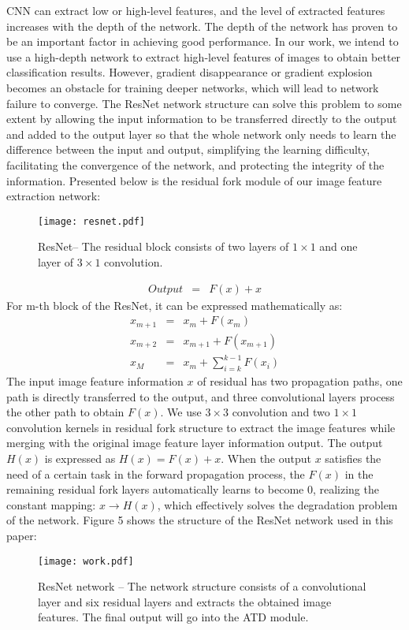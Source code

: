 \documentclass{ecai}
\begin{document}
CNN can extract low or high-level features, and the level of extracted features increases with the depth of the network. The depth of the network has proven to be an important factor in achieving good performance. In our work, we intend to use a high-depth network to extract high-level features of images to obtain better classification results. However, gradient disappearance or gradient explosion becomes an obstacle for training deeper networks, which will lead to network failure to converge. The ResNet network structure can solve this problem to some extent by allowing the input information to be transferred directly to the output and added to the output layer so that the whole network only needs to learn the difference between the input and output, simplifying the learning difficulty, facilitating the convergence of the network, and protecting the integrity of the information. Presented below is the residual fork module of our image feature extraction network:

\begin{figure}
\centerline{\texttt{[image: resnet.pdf]}}
\caption{ResNet-- The residual block consists of two layers of $1\times 1$  and one layer of $3\times 1$ convolution. }
\end{figure}

\begin{eqnarray}
Output  & = & F(x)+x
\end{eqnarray}
For m-th block of the ResNet, it can be expressed mathematically as:
\begin{eqnarray}
x_{m+1} & = & x_m+F(x_m)\\
x_{m+2} & = & x_{m+1}+F(x_{m+1})\\
x_M & = & x_m+\sum\limits_{i=k}^{k-1}F(x_i)
\end{eqnarray}
The input image feature information $x$ of residual has two propagation paths, one path is directly transferred to the output, and three convolutional layers process the other path to obtain $F(x)$. We use $3\times 3$ convolution and two $1\times 1$  convolution kernels in residual fork structure to extract the image features while merging with the original image feature layer information output. The output $H(x)$ is expressed as $H(x) = F(x) + x$. When the output $x$ satisfies the need of a certain task in the forward propagation process, the $F(x)$ in the remaining residual fork layers automatically learns to become $0$, realizing the constant mapping: $x \longrightarrow H(x)$, which effectively solves the degradation problem of the network. Figure 5 shows the structure of the ResNet network used in this paper:
\begin{figure}[htp]
\centering
\texttt{[image: work.pdf]}
\caption{ResNet network -- The network structure consists of a convolutional layer and six residual layers and extracts the obtained image features. The final output will go into the ATD module.}
\end{figure}
\end{document}
